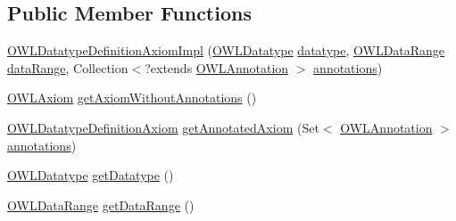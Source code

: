\subsection*{Public Member Functions}
\begin{DoxyCompactItemize}
\item 
\hyperlink{classuk_1_1ac_1_1manchester_1_1cs_1_1owl_1_1owlapi_1_1_o_w_l_datatype_definition_axiom_impl_a2cd2b5b1540fb50772702fe2998d7293}{O\-W\-L\-Datatype\-Definition\-Axiom\-Impl} (\hyperlink{interfaceorg_1_1semanticweb_1_1owlapi_1_1model_1_1_o_w_l_datatype}{O\-W\-L\-Datatype} \hyperlink{classuk_1_1ac_1_1manchester_1_1cs_1_1owl_1_1owlapi_1_1_o_w_l_datatype_definition_axiom_impl_a82c80819ac61bd227d2e74ddeb19a4d6}{datatype}, \hyperlink{interfaceorg_1_1semanticweb_1_1owlapi_1_1model_1_1_o_w_l_data_range}{O\-W\-L\-Data\-Range} \hyperlink{classuk_1_1ac_1_1manchester_1_1cs_1_1owl_1_1owlapi_1_1_o_w_l_datatype_definition_axiom_impl_a1486c60b9a09c2ece01b9c00e8742920}{data\-Range}, Collection$<$?extends \hyperlink{interfaceorg_1_1semanticweb_1_1owlapi_1_1model_1_1_o_w_l_annotation}{O\-W\-L\-Annotation} $>$ \hyperlink{classuk_1_1ac_1_1manchester_1_1cs_1_1owl_1_1owlapi_1_1_o_w_l_axiom_impl_af6fbf6188f7bdcdc6bef5766feed695e}{annotations})
\item 
\hyperlink{interfaceorg_1_1semanticweb_1_1owlapi_1_1model_1_1_o_w_l_axiom}{O\-W\-L\-Axiom} \hyperlink{classuk_1_1ac_1_1manchester_1_1cs_1_1owl_1_1owlapi_1_1_o_w_l_datatype_definition_axiom_impl_a72d2d0327d3a76e74a569f3b3d3b4c48}{get\-Axiom\-Without\-Annotations} ()
\item 
\hyperlink{interfaceorg_1_1semanticweb_1_1owlapi_1_1model_1_1_o_w_l_datatype_definition_axiom}{O\-W\-L\-Datatype\-Definition\-Axiom} \hyperlink{classuk_1_1ac_1_1manchester_1_1cs_1_1owl_1_1owlapi_1_1_o_w_l_datatype_definition_axiom_impl_a6e4dee2d73309d7514e1911bdcc06f14}{get\-Annotated\-Axiom} (Set$<$ \hyperlink{interfaceorg_1_1semanticweb_1_1owlapi_1_1model_1_1_o_w_l_annotation}{O\-W\-L\-Annotation} $>$ \hyperlink{classuk_1_1ac_1_1manchester_1_1cs_1_1owl_1_1owlapi_1_1_o_w_l_axiom_impl_af6fbf6188f7bdcdc6bef5766feed695e}{annotations})
\item 
\hyperlink{interfaceorg_1_1semanticweb_1_1owlapi_1_1model_1_1_o_w_l_datatype}{O\-W\-L\-Datatype} \hyperlink{classuk_1_1ac_1_1manchester_1_1cs_1_1owl_1_1owlapi_1_1_o_w_l_datatype_definition_axiom_impl_a7ded2532eba226d77a18ce0ccb8dcd86}{get\-Datatype} ()
\item 
\hyperlink{interfaceorg_1_1semanticweb_1_1owlapi_1_1model_1_1_o_w_l_data_range}{O\-W\-L\-Data\-Range} \hyperlink{classuk_1_1ac_1_1manchester_1_1cs_1_1owl_1_1owlapi_1_1_o_w_l_datatype_definition_axiom_impl_a51b6618e14e9bb4df0f4cc9e6a5bf0b8}{get\-Data\-Range} ()

\end{DoxyCompactItemize}
